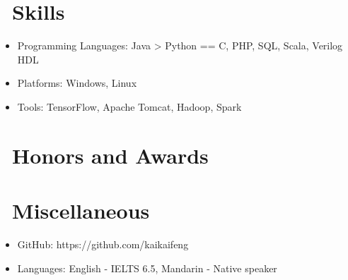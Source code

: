 \documentclass{resume}
\begin{document}

\section{\faCogs\ Skills}
\begin{itemize}[parsep=0.5ex]
  \item Programming Languages: Java > Python == C, PHP, SQL, Scala, Verilog HDL
  \item Platforms: Windows, Linux
  \item Tools: TensorFlow, Apache Tomcat, Hadoop, Spark
\end{itemize}

\section{\faHeartO\ Honors and Awards}

\section{\faInfo\ Miscellaneous}
\begin{itemize}[parsep=0.5ex]
  \item GitHub: https://github.com/kaikaifeng
  \item Languages: English - IELTS 6.5, Mandarin - Native speaker
\end{itemize}

%
%
\end{document}
